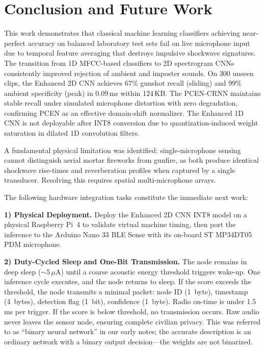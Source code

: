 \documentclass[conference]{IEEEtran}
\begin{document}
\section{Conclusion and Future Work}
\label{sec:conclusion}

This work demonstrates that classical machine learning classifiers achieving near-perfect accuracy on balanced laboratory test sets fail on live microphone input due to temporal feature averaging that destroys impulsive shockwave signatures. The transition from 1D MFCC-based classifiers to 2D spectrogram CNNs consistently improved rejection of ambient and imposter sounds. On 300 unseen clips, the Enhanced 2D CNN achieves 67\% gunshot recall (sliding) and 99\% ambient specificity (peak) in 0.09\,ms within 124\,KB. The PCEN-CRNN maintains stable recall under simulated microphone distortion with zero degradation, confirming PCEN as an effective domain-shift normalizer. The Enhanced 1D CNN is not deployable after INT8 conversion due to quantization-induced weight saturation in dilated 1D convolution filters.

A fundamental physical limitation was identified: single-microphone sensing cannot distinguish aerial mortar fireworks from gunfire, as both produce identical shockwave rise-times and reverberation profiles when captured by a single transducer. Resolving this requires spatial multi-microphone arrays.

The following hardware integration tasks constitute the immediate next work:

\textbf{1) Physical Deployment.} Deploy the Enhanced 2D CNN INT8 model on a physical Raspberry Pi~4 to validate virtual machine timing, then port the inference to the Arduino Nano 33 BLE Sense with its on-board ST MP34DT05 PDM microphone.

\textbf{2) Duty-Cycled Sleep and One-Bit Transmission.} The node remains in deep sleep ($\sim$5\,$\mu$A) until a coarse acoustic energy threshold triggers wake-up. One inference cycle executes, and the node returns to sleep. If the score exceeds the threshold, the node transmits a minimal packet: node ID (1~byte), timestamp (4~bytes), detection flag (1~bit), confidence (1~byte). Radio on-time is under 1.5\,ms per trigger. If the score is below threshold, no transmission occurs. Raw audio never leaves the sensor node, ensuring complete civilian privacy. This was referred to as ``binary neural network'' in our early notes; the accurate description is an ordinary network with a binary output decision---the weights are not binarized.
\end{document}
